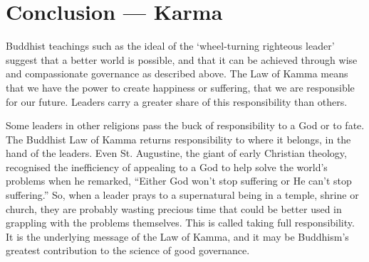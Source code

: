 \documentclass[11pt, openany]{book}
\begin{document}
\chapter*{Conclusion — Karma}

Buddhist teachings such as the ideal of the ‘wheel-turning
 righteous leader’ suggest that a better world is possible, and
that it can be achieved through wise and compassionate governance as described above. The Law of Kamma means that we have the power to create happiness or suffering, that we are responsible for our future. Leaders carry a greater share of this responsibility than others.

Some leaders in other religions pass the buck of responsibility to a God or to fate. The Buddhist Law of Kamma returns responsibility to where it belongs, in the hand of the leaders. Even St. Augustine, the giant of early Christian theology, recognised the inefficiency of appealing to a God to help solve the world’s problems when he remarked, “Either God won’t stop suffering or He can’t stop suffering.” So, when a leader prays to a supernatural being in a temple, shrine or church, they are probably wasting precious time that could be better used in grappling with the problems themselves. This is called taking full responsibility. It is the underlying message of the Law of Kamma, and it may be Buddhism’s greatest contribution to the science of good governance.


\newpage
\end{document}
